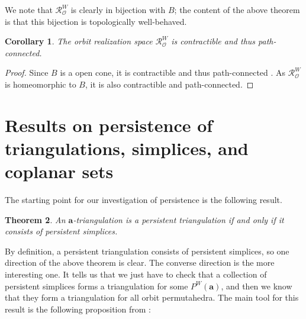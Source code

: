 \documentclass{amsart}
\newtheorem{thm}{Theorem}[section]
\newtheorem{corollary}[thm]{Corollary}
\theoremstyle{definition}
\newcommand{\ospace}{\mathcal{R}_{\mathcal{O}}}
\def\ba{\mathbf{a}}
\def\wperm_#1{P^W(#1)}
\begin{document}
We note that $\ospace^W$ is clearly in bijection with $B$; the content of the above theorem is that this bijection is topologically well-behaved.

\begin{corollary}\label{cor:contractible}
   The orbit realization space $\ospace^W$ is contractible and thus path-connected.
\end{corollary}

\begin{proof}
    Since $B$ is a open cone, it is contractible and thus path-connected \cite{Hatcher}. As $\ospace^W$ is homeomorphic to $B$, it is also contractible and path-connected.
\end{proof}


\section{Results on persistence of triangulations, simplices, and coplanar sets} \label{persist}

The starting point for our investigation of persistence is the following result. 

\begin{thm}\label{thm:persistent-triangulation}
    An $\ba$-triangulation is a persistent triangulation if and only if it consists of persistent simplices.
\end{thm}

By definition, a persistent triangulation consists of persistent simplices, so one direction of the above theorem is clear. The converse direction is the more interesting one. It tells us that we just have to check that a collection of persistent simplices forms a triangulation for some $\wperm_\ba$, and then we know that they form a triangulation for all orbit permutahedra.  The main tool for this result is the following proposition from \cite{DSBW25}:
\end{document}

